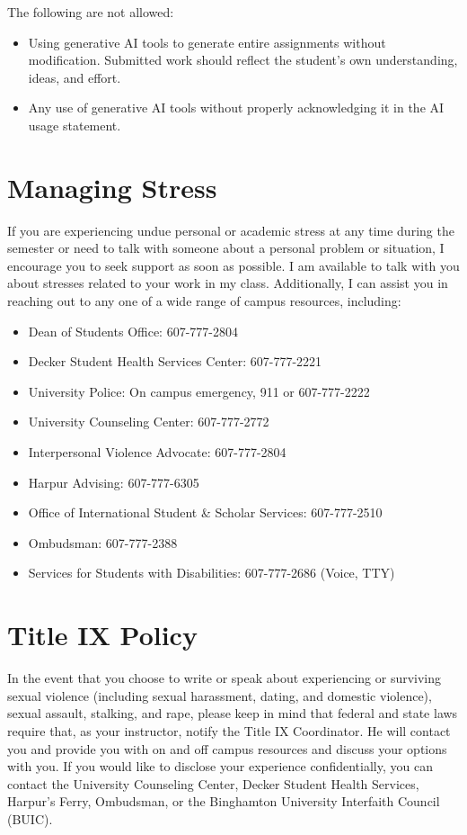 \documentclass[11pt,article,oneside]{memoir} %
\begin{document}
The following are not allowed:

\begin{itemize}
    \item Using generative AI tools to generate entire assignments without modification. Submitted work should reflect the student's own understanding, ideas, and effort.
    \item Any use of generative AI tools without properly acknowledging it in the AI usage statement.
\end{itemize}


\section{Managing Stress}

If you are experiencing undue personal or academic stress at any time during the semester or need to talk with someone about a personal problem or situation, I encourage you to seek support as soon as possible.
I am available to talk with you about stresses related to your work in my class.
Additionally, I can assist you in reaching out to any one of a wide range of campus resources, including:

\begin{itemize}
    \item Dean of Students Office: 607-777-2804
    \item Decker Student Health Services Center: 607-777-2221
    \item University Police: On campus emergency, 911 or 607-777-2222
    \item University Counseling Center: 607-777-2772
    \item Interpersonal Violence Advocate: 607-777-2804
    \item Harpur Advising: 607-777-6305
    \item Office of International Student \& Scholar Services: 607-777-2510
    \item Ombudsman: 607-777-2388
    \item Services for Students with Disabilities: 607-777-2686 (Voice, TTY)
\end{itemize}

\section{Title IX Policy}

In the event that you choose to write or speak about experiencing or surviving sexual violence (including sexual harassment, dating, and domestic violence), sexual assault, stalking, and rape, please keep in mind that federal and state laws require that, as your instructor, notify the Title IX Coordinator.
He will contact you and provide you with on and off campus resources and discuss your options with you.
If you would like to disclose your experience confidentially, you can contact the University Counseling Center, Decker Student Health Services, Harpur's Ferry, Ombudsman, or the Binghamton University Interfaith Council (BUIC).
\end{document}
